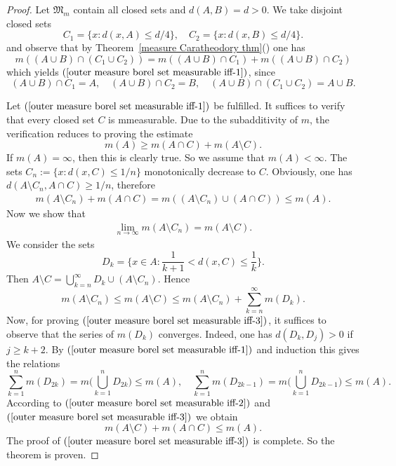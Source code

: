 \begin{proof}
Let $\mathfrak{M}_m$ contain all closed sets and $d(A,B)=d>0$. We take disjoint closed sets
\[C_1=\{x:d(x,A)\leq d/4\},\quad C_2=\{x:d(x,B)\leq d/4\}.\]
and observe that by Theorem~\ref{measure Caratheodory thm}() one has
\[m((A\cup B)\cap(C_1\cup C_2))=m((A\cup B)\cap C_1)+m((A\cup B)\cap C_2)\]
which yields $(\ref{outer measure borel set measurable iff-1})$, since
\[(A\cup B)\cap C_1=A,\quad (A\cup B)\cap C_2=B,\quad (A\cup B)\cap(C_1\cup C_2)=A\cup B.\]

Let $(\ref{outer measure borel set measurable iff-1})$ be fulfilled. It suffices to verify that every closed set $C$ is mmeasurable. Due to the subadditivity of $m$, the verification reduces to proving the estimate
\[m(A)\geq m(A\cap C)+m(A\setminus C).\]
If $m(A)=\infty$, then this is clearly true. So we assume that $m(A)<\infty$. The sets $C_n:=\{x:d(x,C)\leq 1/n\}$ monotonically decrease to $C$. Obviously, one has $d(A\setminus C_n,A\cap C)\geq 1/n$, therefore
\begin{align}\label{outer measure borel set measurable iff-2}
m(A\setminus C_n)+m(A\cap C)=m((A\setminus C_n)\cup(A\cap C))\leq m(A).
\end{align}
Now we show that
\begin{align}\label{outer measure borel set measurable iff-3}
\lim_{n\to\infty}m(A\setminus C_n)=m(A\setminus C).
\end{align}
We consider the sets 
\[D_k=\{x\in A:\frac{1}{k+1}<d(x,C)\leq\frac{1}{k}\}.\]
Then $A\setminus C=\bigcup_{k=n}^{\infty}D_k\cup(A\setminus C_n)$. Hence
\[m(A\setminus C_n)\leq m(A\setminus C)\leq m(A\setminus C_n)+\sum_{k=n}^{\infty}m(D_k).\]
Now, for proving $(\ref{outer measure borel set measurable iff-3})$, it suffices to observe that the series of $m(D_k)$ converges. Indeed, one has $d(D_k,D_j)>0$ if $j\geq k+2$. By $(\ref{outer measure borel set measurable iff-1})$ and induction this gives the relations
\[\sum_{k=1}^{n}m(D_{2k})=m\Big(\bigcup_{k=1}^{n}D_{2k}\Big)\leq m(A),\quad \sum_{k=1}^{n}m(D_{2k-1})=m\Big(\bigcup_{k=1}^{n}D_{2k-1}\Big)\leq m(A).\]
According to $(\ref{outer measure borel set measurable iff-2})$ and $(\ref{outer measure borel set measurable iff-3})$ we obtain
\[m(A\setminus C)+m(A\cap C)\leq m(A).\]
The proof of $(\ref{outer measure borel set measurable iff-3})$ is complete. So the theorem is proven.
\end{proof}
